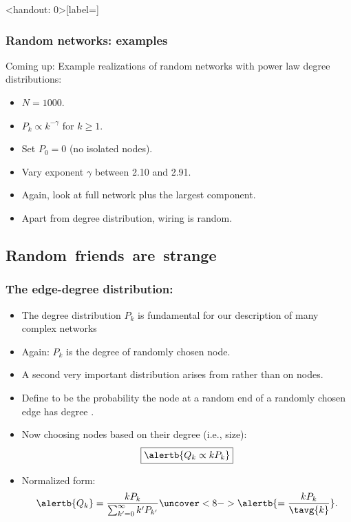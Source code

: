 \begin{frame}<handout: 0>[label=]
  \frametitle{Random networks: examples}

  \begin{block}{Coming up:}
    Example realizations of random networks with
    power law degree distributions:
    \begin{itemize}
    \item<2-> $N=1000$.
    \item<3-> $P_k \propto k^{-\gamma}$ for $k \ge 1$.
    \item<4-> Set $P_0 = 0$ (no isolated nodes).
    \item<5-> Vary exponent $\gamma$ between 2.10 and 2.91.
    \item<6-> Again, look at full network plus the largest component.
    \item<7-> Apart from degree distribution, wiring is random.
    \end{itemize}
  \end{block}

\end{frame}


% 





\subsection{Random\ friends\ are\ strange}

\begin{frame}[label=]
  \frametitle{The edge-degree distribution:}

  \begin{itemize}
  \item<2-> 
    The degree distribution $P_k$ is fundamental for our description
    of many complex networks
  \item<3-> 
    Again: $P_k$ is the degree of \alert{randomly chosen node}.
  \item<4-> 
    A second very important distribution arises
    from  rather than on nodes.
  \item<5->
    Define  to be the 
    probability the node at a \alert{random end}
    of a \alert{randomly chosen edge} has
    degree .
  \item<6-> Now choosing nodes based on their degree (i.e., size):
    $$
    \boxed{
      \alertb{Q_k \propto k P_k}
    }
    $$
  \item<7->
    Normalized form:
    $$
    \alertb{Q_k} = \frac{kP_k}{\sum_{k'=0}^{\infty} k' P_{k'}}
    \uncover<8->
    {
      \alertb{= \frac{kP_k}{\tavg{k}}}.
    }
    $$
  \end{itemize}

\end{frame}

